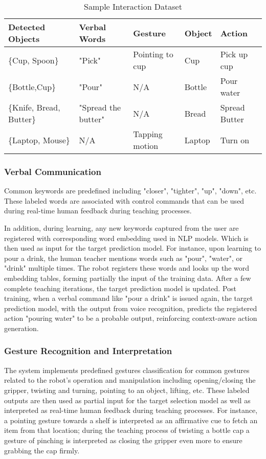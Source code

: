\documentclass[conference]{IEEEtran}
\begin{document}
\begin{table*}[h]
\centering
\caption{Sample Interaction Dataset}\label{tab:interactionDataset}
\begin{tabularx}{\textwidth}{|X|X|X|X|X|}
\hline
\textbf{Detected Objects} & \textbf{Verbal Words} & \textbf{Gesture} & \textbf{Object} & \textbf{Action} \\
\hline
\{Cup, Spoon\} & "Pick" & Pointing to cup & Cup & Pick up cup \\
\hline
\{Bottle,Cup\} & "Pour" & N/A & Bottle & Pour water \\
\hline
\{Knife, Bread, Butter\} & "Spread the butter" & N/A & Bread & Spread Butter \\
\hline
\{Laptop, Mouse\} & N/A & Tapping motion & Laptop & Turn on \\
\hline
\end{tabularx}
\end{table*}

\subsubsection{Verbal Communication}

Common keywords are predefined including "closer", "tighter", "up", "down", etc. These labeled words are associated with control commands that can be used during real-time human feedback during teaching processes. 

In addition, during learning, any new keywords captured from the user are registered with corresponding word embedding used in NLP models. Which is then used as input for the target prediction model. For instance, upon learning to pour a drink, the human teacher mentions words such as "pour", "water", or "drink" multiple times. The robot registers these words and looks up the word embedding tables, forming partially the input of the training data. After a few complete teaching iterations, the target prediction model is updated. Post training, when a verbal command like "pour a drink" is issued again, the target prediction model, with the output from voice recognition, predicts the registered action "pouring water" to be a probable output, reinforcing context-aware action generation.

\subsubsection{Gesture Recognition and Interpretation}

The system implements predefined gestures classification for common gestures related to the robot's operation and manipulation including opening/closing the gripper, twisting and turning, pointing to an object, lifting, etc. These labeled outputs are then used as partial input for the target selection model as well as interpreted as real-time human feedback during teaching processes. For instance, a pointing gesture towards a shelf is interpreted as an affirmative cue to fetch an item from that location; during the teaching process of twisting a bottle cap a gesture of pinching is interpreted as closing the gripper even more to ensure grabbing the cap firmly.
\end{document}
